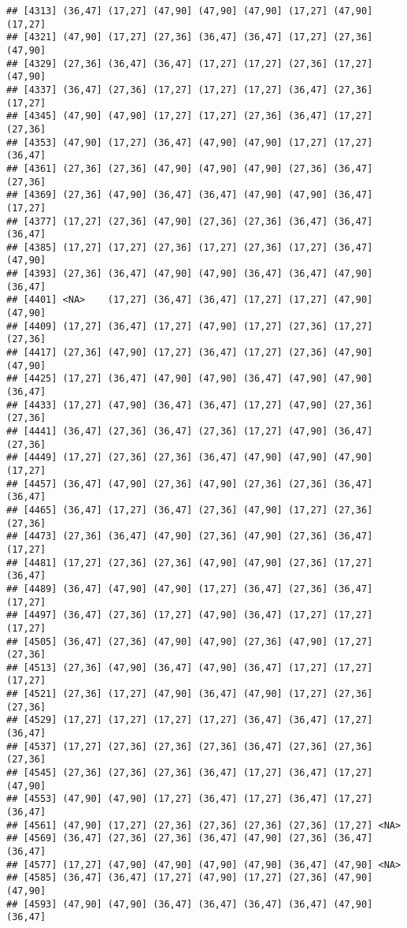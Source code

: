\documentclass[12pt,]{article}
\begin{document}
\begin{verbatim}
## [4313] (36,47] (17,27] (47,90] (47,90] (47,90] (17,27] (47,90] (17,27]
## [4321] (47,90] (17,27] (27,36] (36,47] (36,47] (17,27] (27,36] (47,90]
## [4329] (27,36] (36,47] (36,47] (17,27] (17,27] (27,36] (17,27] (47,90]
## [4337] (36,47] (27,36] (17,27] (17,27] (17,27] (36,47] (27,36] (17,27]
## [4345] (47,90] (47,90] (17,27] (17,27] (27,36] (36,47] (17,27] (27,36]
## [4353] (47,90] (17,27] (36,47] (47,90] (47,90] (17,27] (17,27] (36,47]
## [4361] (27,36] (27,36] (47,90] (47,90] (47,90] (27,36] (36,47] (27,36]
## [4369] (27,36] (47,90] (36,47] (36,47] (47,90] (47,90] (36,47] (17,27]
## [4377] (17,27] (27,36] (47,90] (27,36] (27,36] (36,47] (36,47] (36,47]
## [4385] (17,27] (17,27] (27,36] (17,27] (27,36] (17,27] (36,47] (47,90]
## [4393] (27,36] (36,47] (47,90] (47,90] (36,47] (36,47] (47,90] (36,47]
## [4401] <NA>    (17,27] (36,47] (36,47] (17,27] (17,27] (47,90] (47,90]
## [4409] (17,27] (36,47] (17,27] (47,90] (17,27] (27,36] (17,27] (27,36]
## [4417] (27,36] (47,90] (17,27] (36,47] (17,27] (27,36] (47,90] (47,90]
## [4425] (17,27] (36,47] (47,90] (47,90] (36,47] (47,90] (47,90] (36,47]
## [4433] (17,27] (47,90] (36,47] (36,47] (17,27] (47,90] (27,36] (27,36]
## [4441] (36,47] (27,36] (36,47] (27,36] (17,27] (47,90] (36,47] (27,36]
## [4449] (17,27] (27,36] (27,36] (36,47] (47,90] (47,90] (47,90] (17,27]
## [4457] (36,47] (47,90] (27,36] (47,90] (27,36] (27,36] (36,47] (36,47]
## [4465] (36,47] (17,27] (36,47] (27,36] (47,90] (17,27] (27,36] (27,36]
## [4473] (27,36] (36,47] (47,90] (27,36] (47,90] (27,36] (36,47] (17,27]
## [4481] (17,27] (27,36] (27,36] (47,90] (47,90] (27,36] (17,27] (36,47]
## [4489] (36,47] (47,90] (47,90] (17,27] (36,47] (27,36] (36,47] (17,27]
## [4497] (36,47] (27,36] (17,27] (47,90] (36,47] (17,27] (17,27] (17,27]
## [4505] (36,47] (27,36] (47,90] (47,90] (27,36] (47,90] (17,27] (27,36]
## [4513] (27,36] (47,90] (36,47] (47,90] (36,47] (17,27] (17,27] (17,27]
## [4521] (27,36] (17,27] (47,90] (36,47] (47,90] (17,27] (27,36] (27,36]
## [4529] (17,27] (17,27] (17,27] (17,27] (36,47] (36,47] (17,27] (36,47]
## [4537] (17,27] (27,36] (27,36] (27,36] (36,47] (27,36] (27,36] (27,36]
## [4545] (27,36] (27,36] (27,36] (36,47] (17,27] (36,47] (17,27] (47,90]
## [4553] (47,90] (47,90] (17,27] (36,47] (17,27] (36,47] (17,27] (36,47]
## [4561] (47,90] (17,27] (27,36] (27,36] (27,36] (27,36] (17,27] <NA>   
## [4569] (36,47] (27,36] (27,36] (36,47] (47,90] (27,36] (36,47] (36,47]
## [4577] (17,27] (47,90] (47,90] (47,90] (47,90] (36,47] (47,90] <NA>   
## [4585] (36,47] (36,47] (17,27] (47,90] (17,27] (27,36] (47,90] (47,90]
## [4593] (47,90] (47,90] (36,47] (36,47] (36,47] (36,47] (47,90] (36,47]

\end{verbatim}
\end{document}
